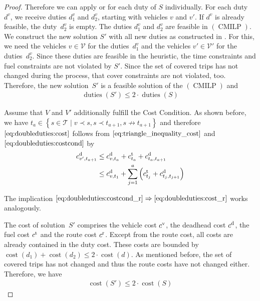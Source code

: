 \begin{proof}
Therefore we can apply  or  for each duty of $S$ individually. For each duty~$d^v$, we receive duties $d^v_1$ and $d^v_2$, starting with vehicles $v$ and $v'$. If $d^v$ is already feasible, the duty~$d^v_2$ is empty. The duties $d^v_1$ and $d^v_2$ are feasible in $(\operatorname{CMILP})$. We construct the new solution $S'$ with all new duties as constructed in . For this, we need the vehicles $v\in\mathcal{V}$ for the duties~$d^v_1$ and the vehicles ${v'\in\mathcal{V}'}$ for the duties~$d^v_2$. Since these duties are feasible in the heuristic, the time constraints and fuel constraints are not violated by $S'$. Since the set of covered trips has not changed during the process, that cover constraints are not violated, too. Therefore, the new solution~$S'$ is a feasible solution of the $(\operatorname{CMILP})$ and
\begin{align*}
	\operatorname{duties}\left(S'\right) \leq 2\cdot\operatorname{duties}\left(S\right)
\end{align*}

Assume that $V$ and $V'$ additionally fulfill the Cost Condition. As shown before, we have ${t_a\in\left\{s\in\mathcal{T}\mid v\prec s, s\prec t_{a+1}, s\not\to t_{a+1}\right\}}$ and therefore $\eqref{eq:doubleduties:cost}$ follows from $\eqref{eq:triangle_inequality_cost}$ and $\eqref{eq:doubleduties:costcond}$ by
\begin{align*}
	c^{\operatorname{d}}_{v',t_{a+1}} & \leq c^{\operatorname{d}}_{v,t_a} + c^{\operatorname{t}}_{t_a} + c^{\operatorname{d}}_{t_a,t_{a+1}} \\
	& \leq c^{\operatorname{d}}_{v,t_1} + \sum_{j=1}^a \left(c^{\operatorname{t}}_{t_j} + c^{\operatorname{d}}_{t_j,t_{j+1}}\right)
\end{align*}

The implication ${\eqref{eq:doubleduties:costcond_r}\Rightarrow\eqref{eq:doubleduties:cost_r}}$ works analogously.

The cost of solution~$S'$ comprises the vehicle cost $c^{\operatorname{v}}$, the deadhead cost $c^{\operatorname{d}}$, the fuel cost $c^{\operatorname{t}}$ and the route cost $c^{\operatorname{r}}$. Except from the route cost, all costs are already contained in the duty cost. These costs are bounded by ${\operatorname{cost}\left(d_1\right) + \operatorname{cost}\left(d_2\right) \leq 2\cdot\operatorname{cost}\left(d\right)}$. As mentioned before, the set of covered trips has not changed and thus the route costs have not changed either. Therefore, we have
\begin{align*}
	\operatorname{cost}\left(S'\right) \leq 2\cdot\operatorname{cost}\left(S\right)
\end{align*}

\end{proof}

